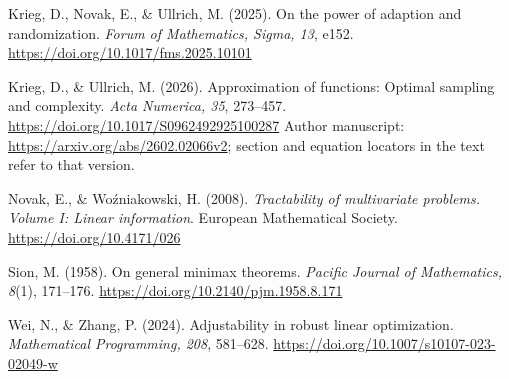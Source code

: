 Krieg, D., Novak, E., \& Ullrich, M. (2025).
On the power of adaption and randomization.
\emph{Forum of Mathematics, Sigma, 13}, e152.
\url{https://doi.org/10.1017/fms.2025.10101}

Krieg, D., \& Ullrich, M. (2026).
Approximation of functions: Optimal sampling and complexity.
\emph{Acta Numerica, 35}, 273--457.
\url{https://doi.org/10.1017/S0962492925100287}
Author manuscript: \url{https://arxiv.org/abs/2602.02066v2};
section and equation locators in the text refer to that version.

Novak, E., \& Wo{\'z}niakowski, H. (2008).
\emph{Tractability of multivariate problems. Volume I: Linear information}.
European Mathematical Society.
\url{https://doi.org/10.4171/026}

Sion, M. (1958). On general minimax theorems.
\emph{Pacific Journal of Mathematics, 8}(1), 171--176.
\url{https://doi.org/10.2140/pjm.1958.8.171}

Wei, N., \& Zhang, P. (2024). Adjustability in robust linear optimization.
\emph{Mathematical Programming, 208}, 581--628.
\url{https://doi.org/10.1007/s10107-023-02049-w}
